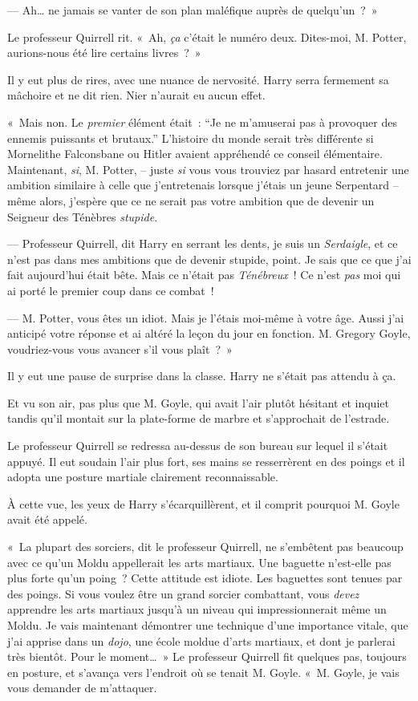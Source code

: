 --- Ah… ne jamais se vanter de son plan maléfique auprès de quelqu'un~?~»

Le professeur Quirrell rit.
«~Ah, \emph{ça} c'était le numéro deux.
Dites-moi, M. Potter, aurions-nous été lire certains livres~?~»

Il y eut plus de rires, avec une nuance de nervosité.
Harry serra fermement sa mâchoire et ne dit rien.
Nier n'aurait eu aucun effet.

«~Mais non.
Le \emph{premier} élément était~: “Je ne m'amuserai pas à provoquer des ennemis puissants et brutaux.” L'histoire du monde serait très différente si Mornelithe Falconsbane ou Hitler avaient appréhendé ce conseil élémentaire.
Maintenant, \emph{si}, M. Potter, -- juste \emph{si} vous vous trouviez par hasard entretenir une ambition similaire à celle que j'entretenais lorsque j'étais un jeune Serpentard -- même alors, j'espère que ce ne serait pas votre ambition que de devenir un Seigneur des Ténèbres \emph{stupide}.

--- Professeur Quirrell, dit Harry en serrant les dents, je suis un \emph{Serdaigle}, et ce n'est pas dans mes ambitions que de devenir stupide, point.
Je sais que ce que j'ai fait aujourd'hui était bête.
Mais ce n'était pas \emph{Ténébreux}~!
Ce n'est \emph{pas} moi qui ai porté le premier coup dans ce combat~!

--- M. Potter, vous êtes un idiot.
Mais je l'étais moi-même à votre âge.
Aussi j'ai anticipé votre réponse et ai altéré la leçon du jour en fonction.
M. Gregory Goyle, voudriez-vous vous avancer s'il vous plaît~?~»

Il y eut une pause de surprise dans la classe.
Harry ne s'était pas attendu à ça.

Et vu son air, pas plus que M. Goyle, qui avait l'air plutôt hésitant et inquiet tandis qu'il montait sur la plate-forme de marbre et s'approchait de l'estrade.

Le professeur Quirrell se redressa au-dessus de son bureau sur lequel il s'était appuyé.
Il eut soudain l'air plus fort, ses mains se resserrèrent en des poings et il adopta une posture martiale clairement reconnaissable.

À cette vue, les yeux de Harry s'écarquillèrent, et il comprit pourquoi M. Goyle avait été appelé.

«~La plupart des sorciers, dit le professeur Quirrell, ne s'embêtent pas beaucoup avec ce qu'un Moldu appellerait les arts martiaux.
Une baguette n'est-elle pas plus forte qu'un poing~?
Cette attitude est idiote.
Les baguettes sont tenues par des poings.
Si vous voulez être un grand sorcier combattant, vous \emph{devez} apprendre les arts martiaux jusqu'à un niveau qui impressionnerait même un Moldu.
Je vais maintenant démontrer une technique d'une importance vitale, que j'ai apprise dans un \emph{dojo}, une école moldue d'arts martiaux, et dont je parlerai très bientôt.
Pour le moment…~»
Le professeur Quirrell fit quelques pas, toujours en posture, et s'avança vers l'endroit où se tenait M. Goyle.
«~M. Goyle, je vais vous demander de m'attaquer.

